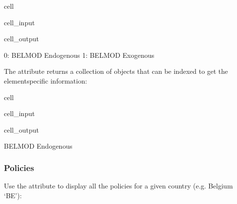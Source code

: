 \documentclass[letterpaper,10pt,english]{sphinxmanual}
\begin{document}
\begin{sphinxuseclass}{cell}
\begin{sphinxuseclass}{cell_input}
\begin{sphinxVerbatim}[commandchars=\\\{\}]
\PYG{p}{[}\PYG{p}{]}
\end{sphinxVerbatim}

\end{sphinxuseclass}
\begin{sphinxuseclass}{cell_output}
\begin{sphinxVerbatim}[commandchars=\\\{\}]
0: BELMOD \PYGZhy{} Endogenous
1: BELMOD \PYGZhy{} Exogenous 
\end{sphinxVerbatim}

\end{sphinxuseclass}
\end{sphinxuseclass}
\sphinxAtStartPar
The attribute returns a collection of  objects that can be indexed to get the element\sphinxhyphen{}specific information:

\begin{sphinxuseclass}{cell}
\begin{sphinxuseclass}{cell_input}
\begin{sphinxVerbatim}[commandchars=\\\{\}]
\PYG{p}{[}\PYG{p}{]}\PYG{p}{[}\PYG{p}{]}
\end{sphinxVerbatim}

\end{sphinxuseclass}
\begin{sphinxuseclass}{cell_output}
\begin{sphinxVerbatim}[commandchars=\\\{\}]
\PYGZsq{}BELMOD \PYGZhy{} Endogenous\PYGZsq{}
\end{sphinxVerbatim}

\end{sphinxuseclass}
\end{sphinxuseclass}

\subsubsection{Policies}
\label{\detokenize{userguide:policies}}
\sphinxAtStartPar
Use the attribute  to display all the policies for a given country (e.g. Belgium ‘BE’):
\end{document}
